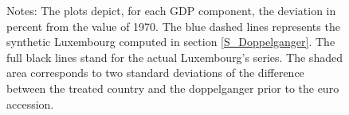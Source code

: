 \documentclass[12pt]{article}
\newcommand{\annote}[1]{\parbox{\textwidth}{\renewcommand{\baselinestretch}{1.0}\vspace{12pt} \small Notes: #1}}
\begin{document}
\begin{appendices}
\begin{figure}[h!]
    \annote{The plots depict, for each GDP component, the deviation in percent from the value of 1970. The blue dashed lines represents the synthetic Luxembourg computed in section \ref{S_Doppelganger}. The full black lines stand for the actual Luxembourg's series. The shaded area corresponds to two standard deviations of the difference between the treated country and the doppelganger prior to the euro accession. }
\end{figure}


\end{appendices}
\end{document}

